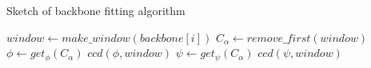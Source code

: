 \begin{algorithm}
\caption{Sketch of backbone fitting algorithm}
\label{alg:ccd}
\begin{algorithmic}
			\STATE $window \gets make\_window(backbone[i])$
				\STATE $C_\alpha \gets remove\_first(window)$
				\STATE $\phi \gets get_\phi(C_\alpha)$
				\STATE $ccd(\phi,window)$
				\STATE $\psi \gets get_\psi(C_\alpha)$
				\STATE $ccd(\psi,window)$
			\ENDWHILE
		\ENDFOR
	\ENDFOR
\end{algorithmic}
\end{algorithm}



